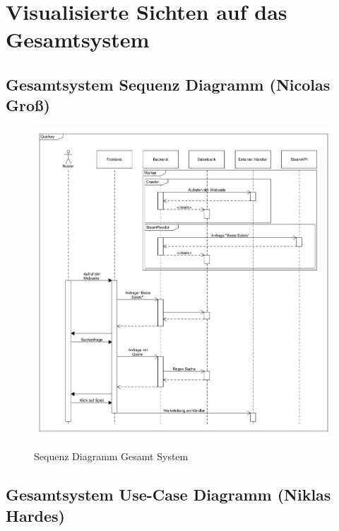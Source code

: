 
\section{Visualisierte Sichten auf das Gesamtsystem}

\subsection*{Gesamtsystem Sequenz Diagramm (Nicolas Groß)}


\begin{figure}[hbt!]
    \begin{minipage}[t]{1\textwidth} %
        \caption{Sequenz Diagramm Gesamt System} %
        \includegraphics[width=1\textwidth]{img/sequence_system.png}\\ %
    \end{minipage}
\end{figure}
\newpage
\subsection*{Gesamtsystem Use-Case Diagramm (Niklas Hardes)}

